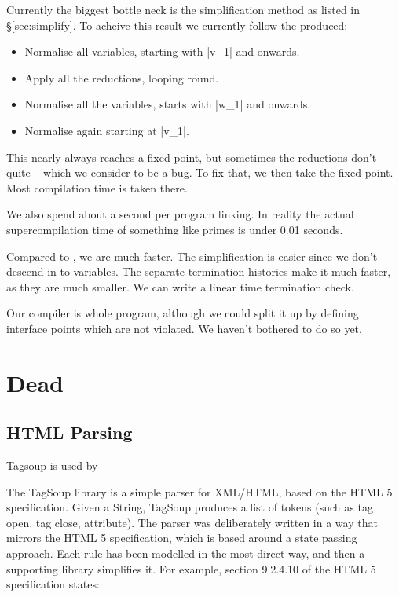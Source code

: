 \documentclass[draft]{sigplanconf}
\begin{document}
Currently the biggest bottle neck is the simplification method as listed in \S\ref{sec:simplify}. To acheive this result we currently follow the produced:

\begin{itemize}
\item Normalise all variables, starting with |v_1| and onwards.
\item Apply all the reductions, looping round.
\item Normalise all the variables, starts with |w_1| and onwards.
\item Normalise again starting at |v_1|.
\end{itemize}

This nearly always reaches a fixed point, but sometimes the reductions don't quite -- which we consider to be a bug. To fix that, we then take the fixed point. Most compilation time is taken there.

We also spend about a second per program linking. In reality the actual supercompilation time of something like primes is under 0.01 seconds.

Compared to \cite{me:ifl2007post}, we are much faster. The simplification is easier since we don't descend in to variables. The separate termination histories make it much faster, as they are much smaller. We can write a linear time termination check.

Our compiler is whole program, although we could split it up by defining interface points which are not violated. We haven't bothered to do so yet.

\section{Dead}
\subsection{HTML Parsing}
\label{sec:tagsoup}


Tagsoup is used by \cite{malde:using_tagsoup}

The TagSoup library \cite{tagsoup} is a simple parser for XML/HTML, based on the HTML 5 specification. Given a String, TagSoup produces a list of tokens (such as tag open, tag close, attribute). The parser was deliberately written in a way that mirrors the HTML 5 specification, which is based around a state passing approach. Each rule has been modelled in the most direct way, and then a supporting library simplifies it. For example, section 9.2.4.10 of the HTML 5 specification states:
\end{document}
